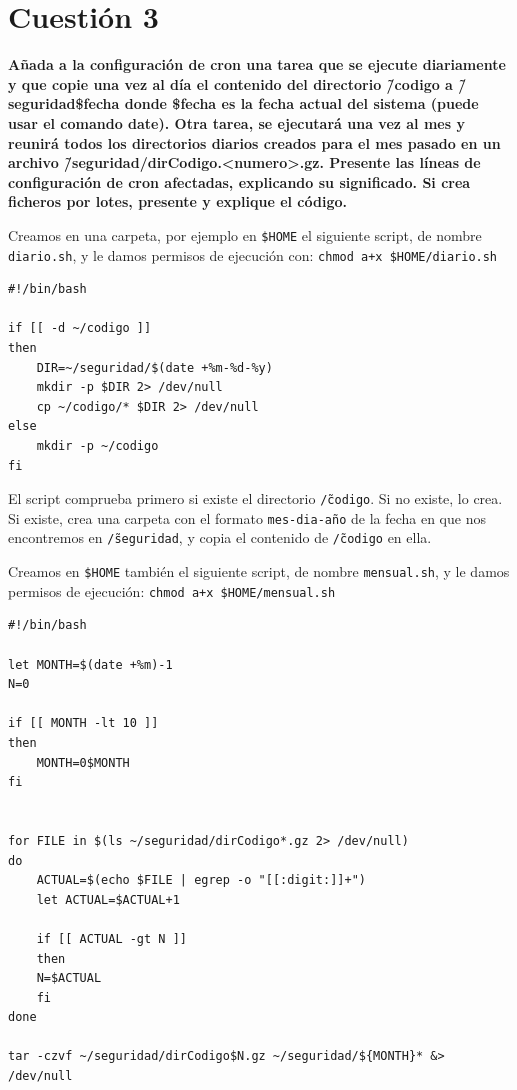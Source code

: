\documentclass[a4paper,10pt]{article}
\newenvironment{answer}{%
\begin{list}{}{%
}%
\item[]}{\end{list}}
\begin{document}
\section{Cuestión 3}
\textbf{ Añada a la configuración de cron una tarea que se ejecute diariamente y que copie una vez al día el contenido del directorio
\~/codigo a \~/seguridad\$fecha donde \$fecha es la fecha actual del sistema (puede usar el comando
date). Otra tarea, se ejecutará una vez al mes y reunirá todos los directorios diarios creados para el mes pasado
en un archivo \~/seguridad/dirCodigo.<numero>.gz. Presente las líneas de configuración de cron afectadas, explicando
su significado. Si crea ficheros por lotes, presente y explique el código.}
\begin{answer}
 Creamos en una carpeta, por ejemplo en \texttt{\$HOME} el siguiente script, de nombre \texttt{diario.sh}, y le damos permisos de ejecución con:
 \texttt{chmod a+x \$HOME/diario.sh}
 
\begin{lstlisting}[style=BashInputStyle]
#!/bin/bash

if [[ -d ~/codigo ]]
then
    DIR=~/seguridad/$(date +%m-%d-%y)
    mkdir -p $DIR 2> /dev/null
    cp ~/codigo/* $DIR 2> /dev/null
else
    mkdir -p ~/codigo
fi
\end{lstlisting}
  
  El script comprueba primero si existe el directorio \texttt{\~/codigo}. Si no existe, lo crea. Si existe, crea una carpeta
  con el formato \texttt{mes-dia-año} de la fecha en que nos encontremos en \texttt{\~/seguridad}, y copia el contenido de \texttt{\~/codigo}
  en ella.
  
  Creamos en \texttt{\$HOME} también el siguiente script, de nombre \texttt{mensual.sh}, y le damos permisos de ejecución: \texttt{chmod a+x \$HOME/mensual.sh}
  
\begin{lstlisting}[style=BashInputStyle]
#!/bin/bash

let MONTH=$(date +%m)-1
N=0

if [[ MONTH -lt 10 ]]
then
    MONTH=0$MONTH
fi


for FILE in $(ls ~/seguridad/dirCodigo*.gz 2> /dev/null)
do
    ACTUAL=$(echo $FILE | egrep -o "[[:digit:]]+")
    let ACTUAL=$ACTUAL+1
    
    if [[ ACTUAL -gt N ]]
    then
	N=$ACTUAL
    fi
done

tar -czvf ~/seguridad/dirCodigo$N.gz ~/seguridad/${MONTH}* &> /dev/null
\end{lstlisting}
  

\end{answer}
\end{document}
